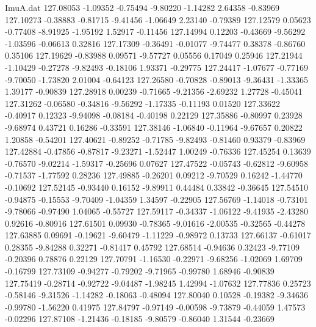 \begin{filecontents}{ImuA.dat}
 127.08053   -1.09352   -0.75494   -9.80220   -1.14282    2.64358   -0.83969
 127.10273   -0.38883   -0.81715   -9.41456   -1.06649    2.23140   -0.79389
 127.12579    0.05623   -0.77408   -8.91925   -1.95192    1.52917   -0.11456
 127.14994    0.12203   -0.43669   -9.56292   -1.03596   -0.06613    0.32816
 127.17309   -0.36491   -0.01077   -9.74477    0.38378   -0.86760    0.35106
 127.19629   -0.83988    0.09571   -9.57727    0.05556    0.17049    0.25946
 127.21944   -1.10429   -0.27278   -9.82493   -0.18106    1.93371   -0.29775
 127.24417   -1.07677   -0.77169   -9.70050   -1.73820    2.01004   -0.64123
 127.26580   -0.70828   -0.89013   -9.36431   -1.33365    1.39177   -0.90839
 127.28918    0.00239   -0.71665   -9.21356   -2.69232    1.27728   -0.45041
 127.31262   -0.06580   -0.34816   -9.56292   -1.17335   -0.11193    0.01520
 127.33622   -0.40917    0.12323   -9.94098   -0.08184   -0.40198    0.22129
 127.35886   -0.80997    0.23928   -9.68974    0.43721    0.16286   -0.33591
 127.38146   -1.06840   -0.11964   -9.67657    0.20822    1.20858   -0.54201
 127.40621   -0.89252   -0.71785   -9.82493   -0.81460    0.93379   -0.83969
 127.42884   -0.47856   -0.87817   -9.23271   -1.52447    1.00249   -0.76336
 127.45254    0.13639   -0.76570   -9.02214   -1.59317   -0.25696    0.07627
 127.47522   -0.05743   -0.62812   -9.60958   -0.71537   -1.77592    0.28236
 127.49885   -0.26201    0.09212   -9.70529    0.16242   -1.44770   -0.10692
 127.52145   -0.93440    0.16152   -9.89911    0.44484    0.33842   -0.36645
 127.54510   -0.94875   -0.15553   -9.70409   -1.04359    1.34597   -0.22905
 127.56769   -1.14018   -0.73101   -9.78066   -0.97490    1.04065   -0.55727
 127.59117   -0.34337   -1.06122   -9.41935   -2.43280    0.92616   -0.80916
 127.61501    0.09930   -0.78365   -9.01616   -2.00535   -0.32565   -0.44278
 127.63885    0.09691   -0.19621   -9.60479   -1.11229   -0.98972    0.13733
 127.66137   -0.61017    0.28355   -9.84288    0.32271   -0.81417    0.45792
 127.68514   -0.94636    0.32423   -9.77109   -0.20396    0.78876    0.22129
 127.70791   -1.16530   -0.22971   -9.68256   -1.02069    1.69709   -0.16799
 127.73109   -0.94277   -0.79202   -9.71965   -0.99780    1.68946   -0.90839
 127.75419   -0.28714   -0.92722   -9.04487   -1.98245    1.42994   -1.07632
 127.77836    0.25723   -0.58146   -9.31526   -1.14282   -0.18063   -0.48094
 127.80040    0.10528   -0.19382   -9.34636   -0.99780   -1.56220    0.41975
 127.84797   -0.97149   -0.00598   -9.73879   -0.44059    1.47573   -0.02296
 127.87108   -1.21436   -0.18185   -9.80579   -0.86040    1.31544   -0.23669

\end{filecontents}
